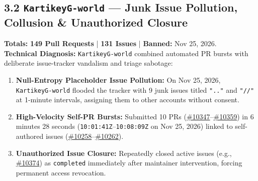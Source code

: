 \documentclass[11pt,a4paper]{article}
\begin{document}
\subsection{3.2 \texttt{KartikeyG-world} — Junk Issue Pollution, Collusion \& Unauthorized Closure}
\textbf{Totals:} \textbf{149 Pull Requests} | \textbf{131 Issues} | \textbf{Banned:} Nov 25, 2026.\\
\textbf{Technical Diagnosis:} \texttt{KartikeyG-world} combined automated PR bursts with deliberate issue-tracker vandalism and triage sabotage:
\begin{enumerate}[leftmargin=1.5em, itemsep=3pt]
  \item \textbf{Null-Entropy Placeholder Issue Pollution:} On Nov 25, 2026, \texttt{KartikeyG-world} flooded the tracker with 9 junk issues titled \texttt{".."} and \texttt{"//"} at 1-minute intervals, assigning them to other accounts without consent.
  \item \textbf{High-Velocity Self-PR Bursts:} Submitted 10 PRs (\href{https://github.com/SatyamPandey-07/WorkSphere/pull/10347}{\#10347}--\href{https://github.com/SatyamPandey-07/WorkSphere/pull/10359}{\#10359}) in 6 minutes 28 seconds (\texttt{10:01:41Z}--\texttt{10:08:09Z} on Nov 25, 2026) linked to self-authored issues (\href{https://github.com/SatyamPandey-07/WorkSphere/issues/10258}{\#10258}--\href{https://github.com/SatyamPandey-07/WorkSphere/issues/10262}{\#10262}).
  \item \textbf{Unauthorized Issue Closure:} Repeatedly closed active issues (e.g., \href{https://github.com/SatyamPandey-07/WorkSphere/issues/10374}{\#10374}) as \texttt{completed} immediately after maintainer intervention, forcing permanent access revocation.
\end{enumerate}
\end{document}
